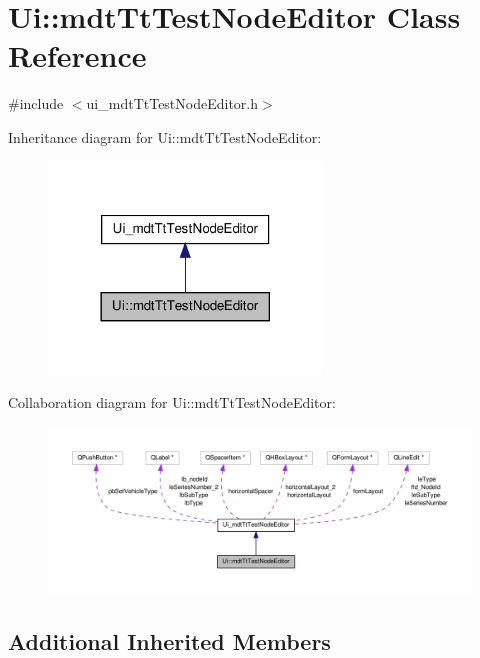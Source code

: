 \hypertarget{class_ui_1_1mdt_tt_test_node_editor}{\section{Ui\-:\-:mdt\-Tt\-Test\-Node\-Editor Class Reference}
\label{class_ui_1_1mdt_tt_test_node_editor}
}


{\ttfamily \#include $<$ui\-\_\-mdt\-Tt\-Test\-Node\-Editor.\-h$>$}



Inheritance diagram for Ui\-:\-:mdt\-Tt\-Test\-Node\-Editor\-:
\nopagebreak
\begin{figure}[H]
\begin{center}
\leavevmode
\includegraphics[width=206pt]{class_ui_1_1mdt_tt_test_node_editor__inherit__graph}
\end{center}
\end{figure}


Collaboration diagram for Ui\-:\-:mdt\-Tt\-Test\-Node\-Editor\-:
\nopagebreak
\begin{figure}[H]
\begin{center}
\leavevmode
\includegraphics[width=350pt]{class_ui_1_1mdt_tt_test_node_editor__coll__graph}
\end{center}
\end{figure}
\subsection*{Additional Inherited Members}


